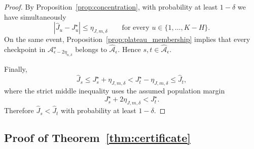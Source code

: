 \documentclass{article}
\begin{document}
\begin{proof}
By Proposition~\ref{prop:concentration}, with probability at least $1-\delta$ we have simultaneously
\begin{equation}
    |\hat J_u - J_u^\star|
    \le
    \eta_{J,m,\delta}
    \qquad
    \text{for every } u\in\{1,\dots,K-H\}.
\end{equation}
On the same event, Proposition~\ref{prop:plateau_membership} implies that every checkpoint in $\mathcal{A}_{\epsilon-2\eta_{n,\delta}}^\star$ belongs to $\widehat{\mathcal{A}}_{\epsilon}$. Hence $s,t\in\widehat{\mathcal{A}}_{\epsilon}$.

Finally,
\begin{equation}
    \hat J_s
    \le
    J_s^\star + \eta_{J,m,\delta}
    <
    J_t^\star - \eta_{J,m,\delta}
    \le
    \hat J_t,
\end{equation}
where the strict middle inequality uses the assumed population margin
\begin{equation}
    J_s^\star + 2\eta_{J,m,\delta} < J_t^\star.
\end{equation}
Therefore $\hat J_s < \hat J_t$ with probability at least $1-\delta$.
\end{proof}

\subsection{Proof of Theorem~\ref{thm:certificate}}
\end{document}
